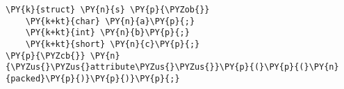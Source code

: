 \begin{Verbatim}[commandchars=\\\{\}]
\PY{k}{struct} \PY{n}{s} \PY{p}{\PYZob{}}
    \PY{k+kt}{char} \PY{n}{a}\PY{p}{;}
    \PY{k+kt}{int} \PY{n}{b}\PY{p}{;}
    \PY{k+kt}{short} \PY{n}{c}\PY{p}{;}
\PY{p}{\PYZcb{}} \PY{n}{\PYZus{}\PYZus{}attribute\PYZus{}\PYZus{}}\PY{p}{(}\PY{p}{(}\PY{n}{packed}\PY{p}{)}\PY{p}{)}\PY{p}{;}
\end{Verbatim}
